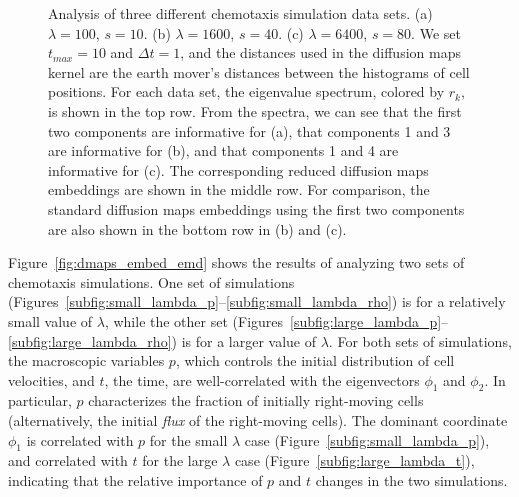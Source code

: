 \documentclass[3p]{elsarticle}
\begin{document}
\begin{figure}[t]
\begin{subfigure}[t]{2in}
\caption{}
\end{subfigure}
%
\caption{Analysis of three different chemotaxis simulation data sets. (a) $\lambda = 100$, $s = 10$. 
(b) $\lambda = 1600$, $s = 40$. (c) $\lambda = 6400$, $s = 80$. We set $t_{max} = 10$ and $\Delta t=1$, and the 
distances used in the diffusion maps kernel are the earth mover's distances between the histograms of cell positions. 
For each data set, the eigenvalue spectrum, colored by $r_k$, is shown in the top row. 
From the spectra, we can see that the first two components are informative for (a), that components 1 and 3 are informative for (b), 
and that components 1 and 4 are informative for (c). 
The corresponding reduced diffusion maps embeddings are shown in the middle row. For comparison, 
the standard diffusion maps embeddings using the first two components are also shown in the bottom row in (b) and (c).}
%
\label{fig:chemotaxis_simulations_harmonics}
\end{figure}

Figure~\ref{fig:dmaps_embed_emd} shows the results of analyzing two sets of chemotaxis simulations.
%
One set of simulations (Figures~\ref{subfig:small_lambda_p}--\ref{subfig:small_lambda_rho}) is for a relatively small value of $\lambda$, 
while the other set (Figures~\ref{subfig:large_lambda_p}--\ref{subfig:large_lambda_rho}) is for a larger value of $\lambda$.
%
For both sets of simulations, the macroscopic variables $p$, which controls the initial distribution of cell velocities, and $t$, the time, 
are well-correlated with the eigenvectors $\phi_1$ and $\phi_2$.
%
In particular, $p$ characterizes the fraction of initially right-moving cells (alternatively, the initial {\em flux} of the right-moving cells). 
%
%
The dominant coordinate $\phi_1$ is correlated with $p$ for the small $\lambda$ case (Figure~\ref{subfig:small_lambda_p}), 
and correlated with $t$ for the large $\lambda$ case (Figure~\ref{subfig:large_lambda_t}), indicating that the relative 
importance of $p$ and $t$ changes in the two simulations.
%
\end{document}
